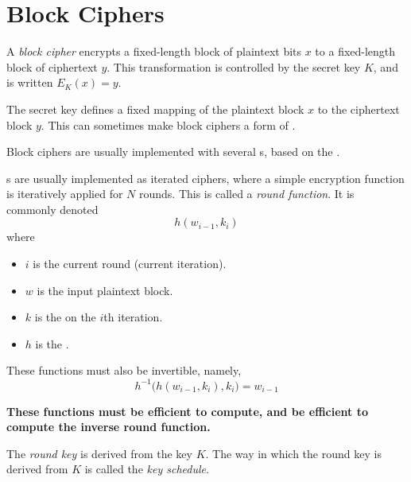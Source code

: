 \section{Block Ciphers}\label{sec:Block_Ciphers}
\begin{definition}\label{def:Block_Cipher}
  A \emph{block cipher} encrypts a fixed-length block of plaintext bits $x$ to a fixed-length block of ciphertext $y$.
  This transformation is controlled by the secret key $K$, and is written $E_{K}(x) = y$.

  The secret key defines a fixed mapping of the plaintext block $x$ to the ciphertext block $y$.
  This can sometimes make block ciphers a form of .

  Block ciphers are usually implemented with several s, based on the .
\end{definition}

\begin{definition}\label{def:Round_Function}
  s are usually implemented as iterated ciphers, where a simple encryption function is iteratively applied for $N$ rounds.
  This is called a \emph{round function}.
  It is commonly denoted
  \begin{equation}\label{eq:Round_Function}
    h(w_{i-1}, k_{i})
  \end{equation}
  where
  \begin{itemize}[noitemsep]
  \item $i$ is the current round (current iteration).
  \item $w$ is the input plaintext block.
  \item $k$ is the  on the $i$th iteration.
  \item $h$ is the .
  \end{itemize}

  These functions must also be invertible, namely,
  \begin{equation}\label{eq:Round_Function_Invertible}
    h^{-1} \bigl( h(w_{i-1}, k_{i}), k_{i} \bigr) = w_{i-1}
  \end{equation}

  \textbf{These functions must be efficient to compute, and be efficient to compute the inverse round function.}
\end{definition}

\begin{definition}\label{def:Round_Key}
  The \emph{round key} is derived from the key $K$.
  The way in which the round key is derived from $K$ is called the \emph{key schedule}.
\end{definition}

